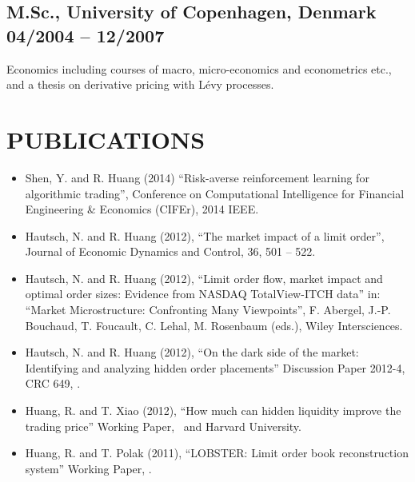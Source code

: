 \documentclass[a4paper,10pt]{article}
\begin{document}
\subsection{M.Sc., University of Copenhagen, Denmark \hfill 04/2004 -- 12/2007}
\begin{idesc}
\item[Economics] including courses of macro, micro-economics and econometrics etc., and a thesis on derivative pricing with L\'{e}vy processes.  
\end{idesc}

\section{PUBLICATIONS}
\begin{itemize}
\item Shen, Y. and R. Huang (2014) ``Risk-averse reinforcement learning for algorithmic trading'', Conference on Computational Intelligence for Financial Engineering \& Economics (CIFEr), 2014 IEEE.
\item Hautsch, N. and R. Huang (2012), ``The market impact of a limit order'', Journal of Economic Dynamics and Control, 36, 501 – 522.
\item  Hautsch, N. and R. Huang (2012), ``Limit order flow, market impact and optimal order sizes: Evidence from NASDAQ TotalView-ITCH data'' in: ``Market Microstructure: Confronting Many Viewpoints'', F. Abergel, J.-P. Bouchaud, T. Foucault, C. Lehal, M. Rosenbaum (eds.), Wiley Intersciences.
\item Hautsch, N. and R. Huang (2012), ``On the dark side of the market: Identifying and analyzing hidden order placements'' Discussion Paper 2012-4, CRC 649, \HU.
\item  Huang, R. and T. Xiao (2012), ``How much can hidden liquidity improve the trading price'' Working Paper, \HU\ and Harvard University.
\item Huang, R. and T. Polak (2011), ``LOBSTER: Limit order book reconstruction system'' Working Paper, \HU.
\end{itemize}
\end{document}

